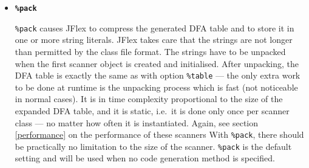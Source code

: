 \documentclass[11pt]{scrartcl}
\begin{document}
\begin{itemize}
\item
  {\bf \texttt{\%pack}}
  
  \texttt{\%pack} causes JFlex to compress the generated DFA table and to
  store it in one or more string literals. JFlex takes care that the
  strings are not longer than permitted by the class file format.
  The strings have to be unpacked when
  the first scanner object is created and initialised.
  After unpacking, the DFA table is exactly the
  same as with option \texttt{\%table} --- the only extra work to be done
  at runtime is the unpacking process which is fast (not noticeable
  in normal cases). It is in time complexity proportional to the
  size of the expanded DFA table, and it is static,
  i.e.\ it is done only once per scanner class --- no matter
  how often it is instantiated.  Again, see section
  \ref{performance} 
  on the performance of these scanners
  With \texttt{\%pack}, there should be practically no
  limitation to the size of the scanner. \texttt{\%pack} is the default
  setting and will be used when no code generation method is specified.
\end{itemize}
\end{document}
